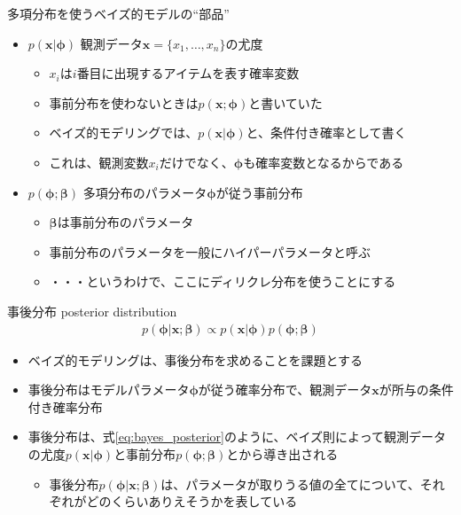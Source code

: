 \documentclass[aspectratio=169,unicode,dvipdfmx,14pt]{beamer}
\begin{document}
\begin{frame}{多項分布を使うベイズ的モデルの``部品''}
\begin{itemize}
\item $p(\bm{x}|\bm{\phi})$ 観測データ$\bm{x}=\{x_1,\ldots,x_n\}$の尤度
\begin{itemize}
\item $x_i$は$i$番目に出現するアイテムを表す確率変数
\item 事前分布を使わないときは$p(\bm{x};\bm{\phi})$と書いていた
\item ベイズ的モデリングでは、$p(\bm{x}|\bm{\phi})$と、条件付き確率として書く
\item これは、観測変数$x_i$だけでなく、$\bm{\phi}$も確率変数となるからである
\end{itemize}
\item $p(\bm{\phi};\bm{\beta})$ 多項分布のパラメータ$\bm{\phi}$が従う事前分布
\begin{itemize}
\item $\bm{\beta}$は事前分布のパラメータ
\item 事前分布のパラメータを一般にハイパーパラメータと呼ぶ
\item ・・・というわけで、ここにディリクレ分布を使うことにする
\end{itemize}
\end{itemize}
\end{frame}

\begin{frame}{事後分布 posterior distribution}
\vspace{-.2in}
\begin{align}
p(\bm{\phi}|\bm{x};\bm{\beta}) \propto p(\bm{x}|\bm{\phi})p(\bm{\phi};\bm{\beta})
\label{eq:bayes_posterior}
\end{align}
\vspace{-.2in}
\begin{itemize}
\item ベイズ的モデリングは、事後分布を求めることを課題とする
\item 事後分布はモデルパラメータ$\bm{\phi}$が従う確率分布で、観測データ$\bm{x}$が所与の条件付き確率分布
\item 事後分布は、式\eqref{eq:bayes_posterior}のように、ベイズ則によって観測データの尤度$p(\bm{x}|\bm{\phi})$と事前分布$p(\bm{\phi};\bm{\beta})$とから導き出される
\begin{itemize}
\item 事後分布$p(\bm{\phi}|\bm{x};\bm{\beta})$は、パラメータが取りうる値の全てについて、それぞれがどのくらいありえそうかを表している
\end{itemize}
\end{itemize}
\end{frame}
\end{document}

